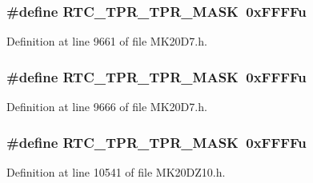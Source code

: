 \subsubsection[{\texorpdfstring{R\+T\+C\+\_\+\+T\+P\+R\+\_\+\+T\+P\+R\+\_\+\+M\+A\+SK}{RTC_TPR_TPR_MASK}}]{\setlength{\rightskip}{0pt plus 5cm}\#define R\+T\+C\+\_\+\+T\+P\+R\+\_\+\+T\+P\+R\+\_\+\+M\+A\+SK~0x\+F\+F\+F\+Fu}\hypertarget{group___r_t_c___register___masks_ga2682f687fa561be2f002fc574d48cc79}{}\label{group___r_t_c___register___masks_ga2682f687fa561be2f002fc574d48cc79}


Definition at line 9661 of file M\+K20\+D7.\+h.

\subsubsection[{\texorpdfstring{R\+T\+C\+\_\+\+T\+P\+R\+\_\+\+T\+P\+R\+\_\+\+M\+A\+SK}{RTC_TPR_TPR_MASK}}]{\setlength{\rightskip}{0pt plus 5cm}\#define R\+T\+C\+\_\+\+T\+P\+R\+\_\+\+T\+P\+R\+\_\+\+M\+A\+SK~0x\+F\+F\+F\+Fu}\hypertarget{group___r_t_c___register___masks_ga2682f687fa561be2f002fc574d48cc79}{}\label{group___r_t_c___register___masks_ga2682f687fa561be2f002fc574d48cc79}


Definition at line 9666 of file M\+K20\+D7.\+h.

\subsubsection[{\texorpdfstring{R\+T\+C\+\_\+\+T\+P\+R\+\_\+\+T\+P\+R\+\_\+\+M\+A\+SK}{RTC_TPR_TPR_MASK}}]{\setlength{\rightskip}{0pt plus 5cm}\#define R\+T\+C\+\_\+\+T\+P\+R\+\_\+\+T\+P\+R\+\_\+\+M\+A\+SK~0x\+F\+F\+F\+Fu}\hypertarget{group___r_t_c___register___masks_ga2682f687fa561be2f002fc574d48cc79}{}\label{group___r_t_c___register___masks_ga2682f687fa561be2f002fc574d48cc79}


Definition at line 10541 of file M\+K20\+D\+Z10.\+h.

